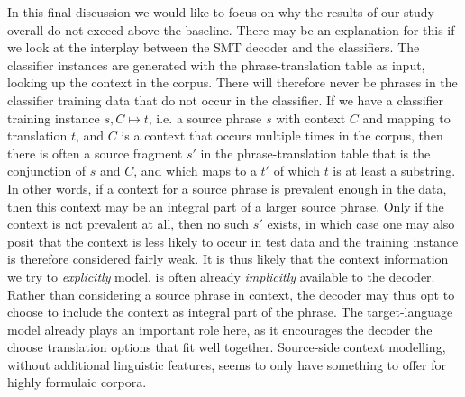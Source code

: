 \documentclass[smallextended]{svjour3}       %
\theoremstyle{break}
\begin{document}
In this final discussion we would like to focus on why the results of our study
overall do not exceed above the baseline.  There may be an explanation for this
if we look at the interplay between the SMT decoder and the classifiers. The
classifier instances are generated with the phrase-translation table as input,
looking up the context in the corpus. There will therefore never be phrases in
the classifier training data that do not occur in the classifier. If we have a
classifier training instance $s,C \mapsto t$, i.e.  a source phrase $s$ with
context $C$ and mapping to translation $t$, and $C$ is a context that occurs
multiple times in the corpus, then there is often a source fragment $s'$ in the
phrase-translation table that is the conjunction of $s$ and $C$, and which maps
to a $t'$ of which $t$ is at least a substring. In other words, if a context
for a source phrase is prevalent enough in the data, then this context may be
an integral part of a larger source phrase. Only if the context is not
prevalent at all, then no such $s'$ exists, in which case one may also posit
that the context is less likely to occur in test data and the training instance
is therefore considered fairly weak.  It is thus likely that the context
information we try to \emph{explicitly} model, is often already
\emph{implicitly} available to the decoder.  Rather than considering a source
phrase in context, the decoder may thus opt to choose to include the context as
integral part of the phrase.  The target-language model already plays an
important role here, as it encourages the decoder the choose translation options
that fit well together. Source-side context modelling, without additional
linguistic features, seems to only have something to offer for highly formulaic
corpora. 




\end{document}
